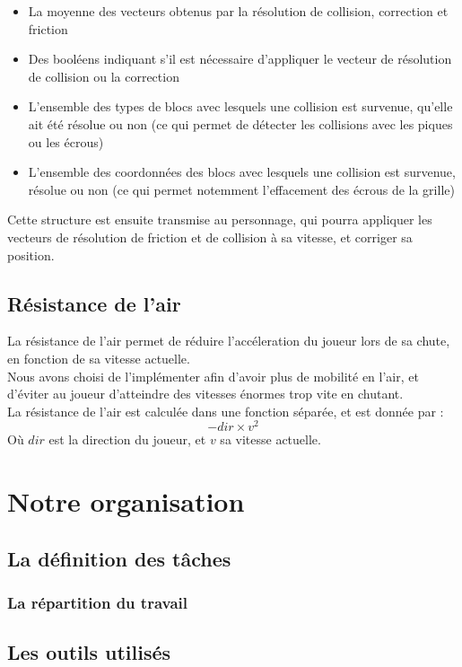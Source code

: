 \documentclass[10pt]{report}
\begin{document}
\begin{itemize}
  \item La moyenne des vecteurs obtenus par la résolution de collision, correction et friction
  \item Des booléens indiquant s'il est nécessaire d'appliquer le vecteur de résolution de collision ou la correction
  \item L'ensemble des types de blocs avec lesquels une collision est survenue, qu'elle ait été résolue ou non (ce qui permet de détecter les collisions avec les piques ou les écrous)
  \item L'ensemble des coordonnées des blocs avec lesquels une collision est survenue, résolue ou non (ce qui permet notemment l'effacement des écrous de la grille)
\end{itemize}

Cette structure est ensuite transmise au personnage, qui pourra appliquer les vecteurs de résolution de friction et de collision à sa vitesse, et corriger sa position.

\subsection{Résistance de l'air}
La résistance de l'air permet de réduire l'accéleration du joueur lors de sa chute, en fonction de sa vitesse actuelle.\\
Nous avons choisi de l'implémenter afin d'avoir plus de mobilité en l'air, et d'éviter au joueur d'atteindre des vitesses énormes trop vite en chutant.\\
La résistance de l'air est calculée dans une fonction séparée, et est donnée par :
\[
 -dir \times v^2
\]
Où \(dir\) est la direction du joueur, et \(v\) sa vitesse actuelle.

\section{Notre organisation}
\subsection{La définition des tâches}
\subsubsection{La répartition du travail}
\subsection{Les outils utilisés}
\end{document}

